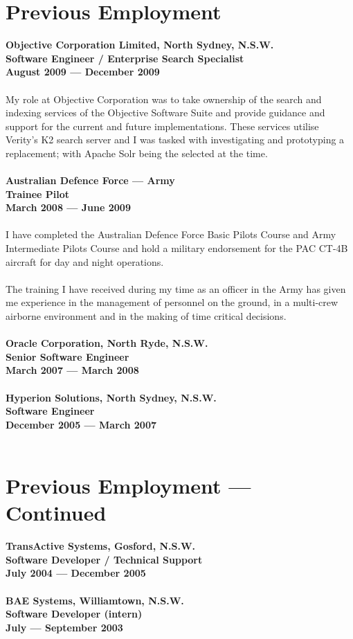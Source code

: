 \documentclass[a4paper]{article}
\begin{document}
\section*{Previous Employment}
\textbf{Objective Corporation Limited, North Sydney, N.S.W.\\Software Engineer / Enterprise Search Specialist\\August 2009 --- December 2009}\\\\
My role at Objective Corporation was to take ownership of the search and indexing services of the Objective Software Suite and provide guidance and support for the current and future implementations. These services utilise Verity's K2 search server and I was tasked with investigating and prototyping a replacement; with Apache Solr being the selected at the time.\\\\
\textbf{Australian Defence Force --- Army\\Trainee Pilot\\March 2008 --- June 2009}\\\\
I have completed the Australian Defence Force Basic Pilots Course and Army Intermediate Pilots Course and hold a military endorsement for the PAC CT-4B aircraft for day and night operations.\\\\
The training I have received during my time as an officer in the Army has given me experience in the management of personnel on the ground, in a multi-crew airborne environment and in the making of time critical decisions.\\\\
\textbf{Oracle Corporation, North Ryde, N.S.W.\\Senior Software Engineer\\March 2007 --- March 2008}\\\\
\textbf{Hyperion Solutions, North Sydney, N.S.W.\\Software Engineer\\December 2005 --- March 2007} \\\\
\newpage
\section*{Previous Employment --- Continued}
\textbf{TransActive Systems, Gosford, N.S.W.\\Software Developer / Technical Support\\July 2004 --- December 2005}\\\\
\textbf{BAE Systems, Williamtown, N.S.W.\\Software Developer (intern)\\July --- September 2003}
\end{document}
